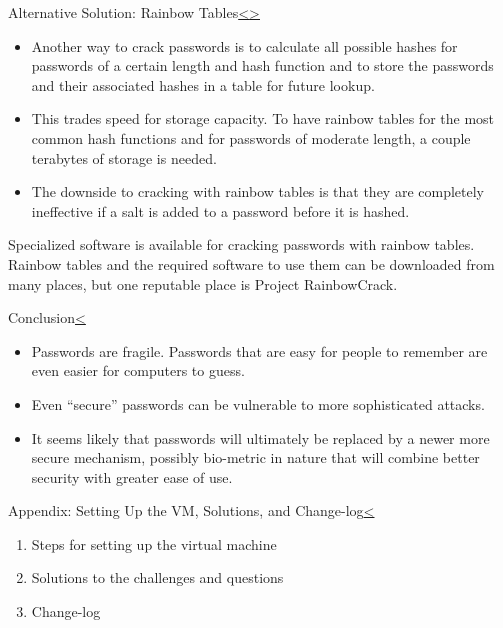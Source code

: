\documentclass[12pt]{extarticle}
\newenvironment{instructionblock}{\Large\bgroup}{\egroup}
\begin{document}
\pagebreak
\begin{slide}{Alternative Solution: Rainbow Tables}{\hyperref[slide 16]{\textless}\hyperref[slide 18]{\textgreater}}
\begin{instructionblock}
\begin{itemize}
\item Another way to crack passwords is to calculate all possible hashes for passwords of a certain length and hash function and to store the passwords and their associated hashes in a table for future lookup. 
\item This trades speed for storage capacity. To have rainbow tables for the most common hash functions and for passwords of moderate length, a couple terabytes of storage is needed. 
\item The downside to cracking with rainbow tables is that they are completely ineffective if a salt is added to a password before it is hashed.
\end{itemize}
\end{instructionblock}
\end{slide}
\cite{rainbowcrack}
\vfill
Specialized software is available for cracking passwords with rainbow tables. Rainbow tables and the required software to use them can be downloaded from many places, but one reputable place is Project RainbowCrack.\cite{rainbowcrack}

\pagebreak
\begin{slide}{Conclusion}{\hyperref[slide 17]{\textless}}
\begin{instructionblock}
\begin{itemize}
\item Passwords are fragile.  Passwords that are easy for people to remember are even easier for computers to guess.
\item Even ``secure'' passwords can be vulnerable to more sophisticated attacks.
\item It seems likely that passwords will ultimately be replaced by a newer more secure mechanism, possibly bio-metric in nature that will combine better security with greater ease of use.
\end{itemize}
\end{instructionblock}
\end{slide}
\vfill

\pagebreak

\begin{slide}{Appendix: Setting Up the VM, Solutions, and Change-log}{\hyperref[slide 14]{\textless}}
	\begin{instructionblock}
		\begin{enumerate}
			\item {Steps for setting up the virtual machine}
			\item {Solutions to the challenges and questions}
				
			\item {Change-log}
		\end{enumerate}
	\end{instructionblock}
\end{slide}
\end{document}
